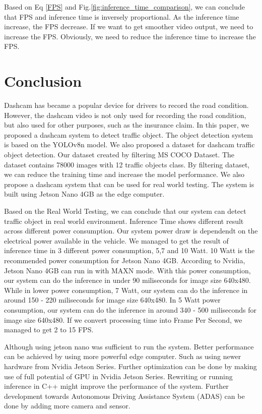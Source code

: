 \documentclass[conference]{IEEEtran}
\begin{document}
Based on Eq \eqref{FPS} and Fig.\ref{fig:inference_time_comparison}, we can conclude that FPS and inference time is inversely proportional. As the inference time increase, the FPS decrease.
If we want to get smoother video output, we need to increase the FPS. Obviously, we need to reduce the inference time to increase the FPS.

\section{Conclusion}
Dashcam has became a popular device for drivers to record the road condition. However, the dashcam video is not only used for recording the road condition, but also used for other purposes, such as the insurance claim. 
In this paper, we proposed a dashcam system to detect traffic object. The object detection system is based on the YOLOv8n model. We also proposed a dataset for dashcam traffic object detection. Our dataset created by filtering MS COCO Dataset. The dataset contains 78000 images with 12 traffic objects class.
By filtering dataset, we can reduce the training time and increase the model performance.
We also propose a dashcam system that can be used for real world testing. The system is built using Jetson Nano 4GB as the edge computer.


Based on the Real World Testing, we can conclude that our system can detect traffic object in real world environment. Inference Time shows different result across different power consumption.
Our system power draw is dependendt on the electrical power available in the vehicle. We managed to get the result of inference time in 3 different power consumption, 5,7 and 10 Watt.
10 Watt is the recommended power consumption for Jetson Nano 4GB. According to Nvidia, Jetson Nano 4GB can run in with MAXN mode. 
With this power consumption, our system can do the inference in under 90 miliseconds for image size 640x480.
While in lower power consumption, 7 Watt, our system can do the inference in around 150 - 220 miliseconds for image size 640x480.
In 5 Watt power consumption, our system can do the inference in around 340 - 500 miliseconds for image size 640x480.
If we convert processing time into Frame Per Second, we managed to get 2 to 15 FPS.


Although using jetson nano was sufficient to run the system. Better performance can be achieved by using more powerful edge computer. Such as using newer hardware from Nvidia Jetson Series. Further optimization can be done by making use of full potential of GPU in Nvidia Jetson Series. Rewriting or running inference in C++ might improve the performance of the system.
Further development towards Autonomous Driving Assistance System (ADAS) can be done by adding more camera and sensor.
\end{document}
